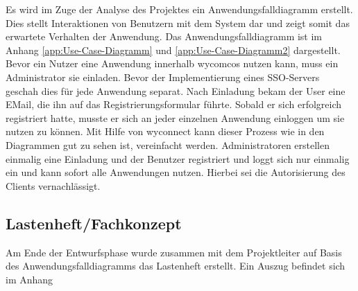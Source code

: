 Es wird im Zuge der Analyse des Projektes ein Anwendungsfalldiagramm erstellt. Dies stellt
Interaktionen von Benutzern mit dem System dar und zeigt somit das erwartete Verhalten der
Anwendung. Das Anwendungsfalldiagramm ist im Anhang \ref{app:Use-Case-Diagramm} und \ref{app:Use-Case-Diagramm2} dargestellt.
Bevor ein Nutzer eine Anwendung innerhalb wycomcos nutzen kann, muss ein Administrator sie einladen. Bevor der Implementierung eines \acs{SSO}-Servers geschah dies für jede Anwendung separat. Nach Einladung bekam der User eine EMail, die ihn auf das Registrierungsformular führte. Sobald er sich erfolgreich registriert hatte, musste er sich an jeder einzelnen Anwendung einloggen um sie nutzen zu können.
Mit Hilfe von wyconnect kann dieser Prozess wie in den Diagrammen gut zu sehen ist, vereinfacht werden. Administratoren erstellen einmalig eine Einladung und der Benutzer registriert und loggt sich nur einmalig ein und kann sofort alle Anwendungen nutzen.
Hierbei sei die Autorisierung des Clients vernachlässigt. 


\subsection{Lastenheft/Fachkonzept}
Am Ende der Entwurfsphase wurde zusammen mit dem Projektleiter auf Basis des Anwendungsfalldiagramms das Lastenheft erstellt. Ein Auszug befindet sich im Anhang 

